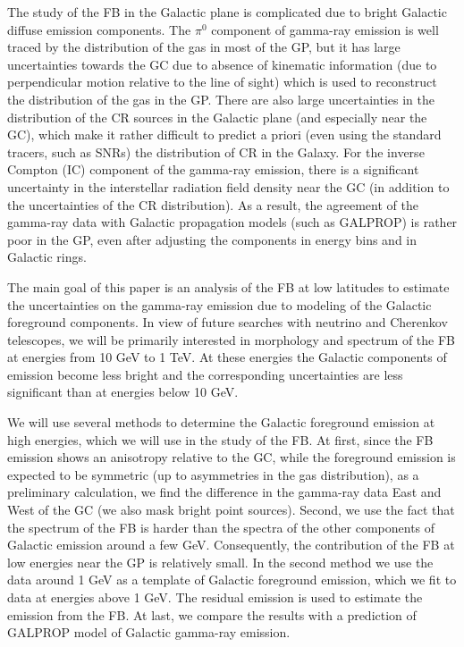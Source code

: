 The study of the FB in the Galactic plane is complicated due to bright Galactic diffuse emission components.
The $\pi^0$ component of gamma-ray emission is well traced by the distribution of the gas in most of the GP,
but it has large uncertainties towards the GC due to absence of kinematic information (due to perpendicular motion relative to the line of sight)
which is used to reconstruct the distribution of the gas in the GP.
There are also large uncertainties in the distribution of the CR sources in the Galactic plane (and especially near the GC),
which make it rather difficult to predict a priori (even using the standard tracers, such as SNRs) the distribution
of CR in the Galaxy.
For the inverse Compton (IC) component of the gamma-ray emission, 
there is a significant uncertainty in the interstellar radiation field density near the GC (in addition to 
the uncertainties of the CR distribution).
As a result, the agreement of the gamma-ray data with Galactic propagation models (such as GALPROP) is rather
poor in the GP, even after adjusting the components in energy bins and in Galactic rings.

The main goal of this paper is an analysis of the FB at low latitudes to estimate the uncertainties on the gamma-ray 
emission due to modeling of the Galactic foreground components.
In view of future searches with neutrino and Cherenkov telescopes, 
we will be primarily interested in morphology and spectrum of the FB at energies from 10 GeV to 1 TeV.
At these energies the Galactic components of emission become less bright
and the corresponding uncertainties are less significant than at energies below 10 GeV.

We will use several methods to determine the Galactic foreground emission at high energies,
which we will use in the study of the FB.
At first, since the FB emission shows an anisotropy relative to the GC, 
while the foreground emission is expected to be symmetric (up to asymmetries in the gas distribution),
as a preliminary calculation, we find the difference in the gamma-ray data East and West of the GC 
(we also mask bright point sources).
Second, we use the fact that the spectrum of the FB is harder than the spectra of the other components of Galactic emission
around a few GeV.
Consequently, the contribution of the FB at low energies near the GP is relatively small. 
In the second method we use the data around 1 GeV as a template of Galactic foreground emission, 
which we fit to data at energies above 1 GeV.
The residual emission is used to estimate the emission from the FB.
At last, we compare the results with a prediction of GALPROP model of Galactic gamma-ray emission.





